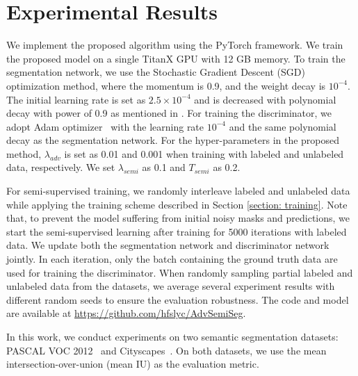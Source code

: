 \documentclass{bmvc2k}
\begin{document}
	\section{Experimental Results}
	\vspace{-2mm}{\flushleft \bf Implementation details.}
	We implement the proposed algorithm using the PyTorch framework.
	We train the proposed model on a single TitanX GPU with 12 GB memory.
	To train the segmentation network, we use the Stochastic Gradient Descent (SGD) optimization method, where the momentum is 0.9, and the weight decay is $10^{-4}$.
	The initial learning rate is set as $2.5 \times 10^{-4}$ and is decreased with polynomial decay with power of 0.9 as mentioned in \cite{deeplab}.
	For training the discriminator, we adopt Adam optimizer~\cite{kingma2014adam} with the learning rate $10^{-4}$ and the same polynomial decay as the segmentation network.
	For the hyper-parameters in the proposed method, $\lambda_{adv}$ is set as 0.01 and 0.001 when training with labeled and unlabeled data, respectively.
	We set $\lambda_{semi}$ as 0.1 and $T_{semi}$ as 0.2.
	
	For semi-supervised training, we randomly interleave labeled and unlabeled data while applying the training scheme described in Section \ref{section: training}.
	Note that, to prevent the model suffering from initial noisy masks and predictions, we start the semi-supervised learning after training for 5000 iterations with labeled data.
	We update both the segmentation network and discriminator network jointly. In each iteration, only the batch containing the ground truth data are used for training the discriminator.
	When randomly sampling partial labeled and unlabeled data from the datasets, we average several experiment results with different random seeds to ensure the evaluation robustness.
	The code and model are available at \url{https://github.com/hfslyc/AdvSemiSeg}.
	
	\vspace{-2mm}{\flushleft \bf Evaluation datasets and metric.}
	In this work, we conduct experiments on two semantic segmentation datasets: PASCAL VOC 2012~\cite{pascal} and Cityscapes~\cite{cityscapes}. 
	On both datasets, we use the mean intersection-over-union (mean IU) as the evaluation metric.
	
\end{document}
